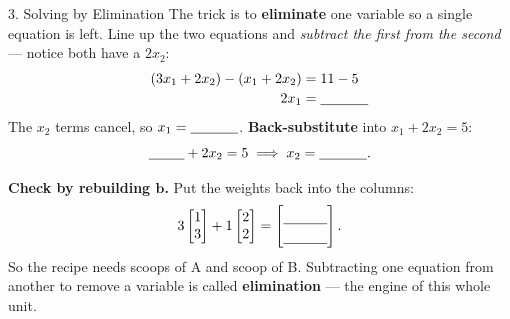 \documentclass[10pt]{article}
\newcommand{\bb}{\mathbf{b}}
\begin{document}
\begin{notesbox}{3. Solving by Elimination}
The trick is to \textbf{eliminate} one variable so a single equation is left. Line up the two
equations and \emph{subtract the first from the second} --- notice both have a $2x_2$:
\[
  \begin{array}{r@{}c@{}l}
    (3x_1 + 2x_2) - (x_1 + 2x_2) &{}={}& 11 - 5 \\[2pt]
    2x_1 &{}={}& \blank{1.2cm}
  \end{array}
\]
The $x_2$ terms cancel, so $x_1 = \blank{1.2cm}$. \textbf{Back-substitute} into $x_1+2x_2=5$:
\[
  \blank{0.9cm} + 2x_2 = 5 \;\Longrightarrow\; x_2 = \blank{1.2cm}.
\]

\vspace{2pt}
\textbf{Check by rebuilding $\bb$.} Put the weights back into the columns:
\[
  3\begin{bmatrix} 1 \\ 3 \end{bmatrix} + 1\begin{bmatrix} 2 \\ 2 \end{bmatrix}
  = \begin{bmatrix}\rule{0pt}{1.1em}\blank{1.1cm}\\[2pt]\blank{1.1cm}\end{bmatrix}.
\]
So the recipe needs \blank{1.4cm} scoops of A and \blank{1.4cm} scoop of B. Subtracting one
equation from another to remove a variable is called \textbf{elimination} --- the engine of this
whole unit.
\end{notesbox}
\end{document}
